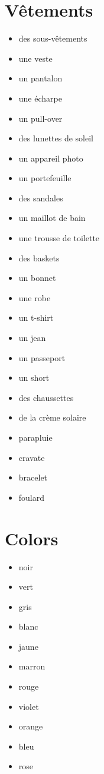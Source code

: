\documentclass{epflnotes}
\begin{document}
\section{V\^etements}

\begin{multicols}{3}
\begin{itemize}
\item des sous-v\^etements
\item une veste
\item un pantalon
\item une écharpe
\item un pull-over
\item des lunettes de soleil
\item un appareil photo
\item un portefeuille
\item des sandales
\item un maillot de bain
\item une trousse de toilette
\item des baskets
\item un bonnet
\item une robe
\item un t-shirt
\item un jean
\item un passeport
\item un short
\item des chaussettes
\item de la crème solaire
\item parapluie
\item cravate
\item bracelet
\item foulard
\end{itemize}
\end{multicols}

\section{Colors}

\begin{multicols}{3}
\begin{itemize}
\item noir
\item vert
\item gris
\item blanc
\item jaune
\item marron
\item rouge
\item violet
\item orange
\item bleu
\item rose
\end{itemize}
\end{multicols}
\end{document}
